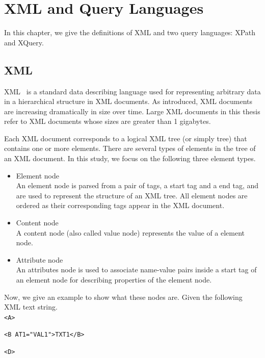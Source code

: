 \chapter{XML and Query Languages}

In this chapter, we give the definitions of XML and two query languages: XPath
and XQuery.


\section{XML}

XML~\cite{XML} is a standard data describing language used for representing
arbitrary data in a hierarchical structure in XML documents. As introduced, XML
documents are increasing dramatically in size over time. Large XML documents in
this thesis refer to XML documents whose sizes are greater than 1 gigabytes.

Each XML document corresponds to a logical XML tree (or simply tree) that
contains one or more elements.  There are several types of elements in the tree
of an XML document. In this study, we focus on the following three element
types.

\begin{itemize}
	\item Element node \\
	An element node is parsed from a pair of tags, a start tag and a end tag, and
	are used to represent the structure of an XML tree. All element nodes are
	ordered as their corresponding tags appear in the XML document.
	\item Content node \\
	A content node (also called value node) represents the value of a element node.
	\item Attribute node \\
	An attributes node is used to associate name-value pairs inside a start tag of
	an element node for describing properties of the element node.
\end{itemize}


Now, we give an example to show what these nodes are. Given the following
XML text string.\\

\hspace{10ex}\texttt{<A>}

\hspace{14ex}\texttt{<B AT1="VAL1">TXT1</B>}

\hspace{14ex}\texttt{<D>}

